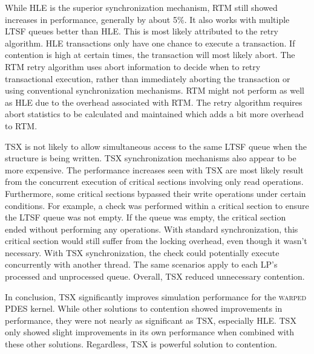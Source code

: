 \documentclass{sig-alternate}
\begin{document}
While HLE is the superior synchronization mechanism, RTM still showed increases in
performance, generally by about 5\%.  It also works with multiple LTSF queues better than
HLE.  This is most likely attributed to the retry algorithm.  HLE transactions only have
one chance to execute a transaction. If contention is high at certain times, the
transaction will most likely abort.  The RTM retry algorithm uses abort information to
decide when to retry transactional execution, rather than immediately aborting the
transaction or using conventional synchronization mechanisms.  RTM might not perform as
well as HLE due to the overhead associated with RTM.  The retry algorithm requires abort
statistics to be calculated and maintained which adds a bit more overhead to RTM.

TSX is not likely to allow simultaneous access to the same LTSF queue when the structure
is being written.  TSX synchronization mechanisms also appear to be more expensive.
The performance increases seen with TSX are most likely result from the concurrent
execution of critical sections involving only read operations.  Furthermore, some critical
sections bypassed their write operations under certain conditions.  For example, a check
was performed within a critical section to ensure the LTSF queue was not empty.  If the
queue was empty, the critical section ended without performing any operations.  With
standard synchronization, this critical section would still suffer from the locking
overhead, even though it wasn't necessary.  With TSX synchronization, the check could
potentially execute concurrently with another thread.  The same scenarios apply to each
LP's processed and unprocessed queue.  Overall, TSX reduced unnecessary contention.


In conclusion, TSX significantly improves simulation performance for the \textsc{warped}
PDES kernel.  While other solutions to contention showed improvements in performance, they
were not nearly as significant as TSX, especially HLE.  TSX only showed slight
improvements in its own performance when combined with these other solutions.  Regardless,
TSX is powerful solution to contention.




\end{document}

